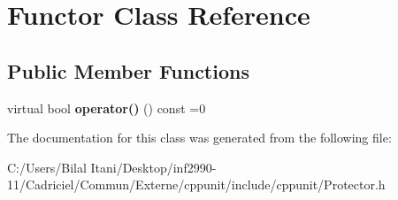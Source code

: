 \hypertarget{class_functor}{}\section{Functor Class Reference}
\label{class_functor}
\subsection*{Public Member Functions}
\begin{DoxyCompactItemize}
\item 
virtual bool {\bfseries operator()} () const  =0\hypertarget{class_functor_a36f20f712e6b220a924d524c05676849}{}\label{class_functor_a36f20f712e6b220a924d524c05676849}

\end{DoxyCompactItemize}


The documentation for this class was generated from the following file\+:\begin{DoxyCompactItemize}
\item 
C\+:/\+Users/\+Bilal Itani/\+Desktop/inf2990-\/11/\+Cadriciel/\+Commun/\+Externe/cppunit/include/cppunit/Protector.\+h\end{DoxyCompactItemize}
